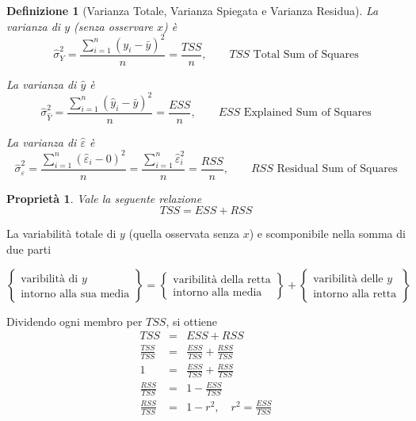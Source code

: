 \documentclass[
  11pt,
]{book}
\theoremstyle{mytheoremstyle}
\newtheorem{proposition}{Proprietà}[section]
\theoremstyle{mydefstyle}
\newtheorem{definition}{Definizione}[section]
\begin{document}
\begin{definition}[Varianza Totale, Varianza Spiegata e Varianza Residua]
La varianza di \(y\) (senza osservare \(x\)) è
\[\hat\sigma_Y^2=\frac{\sum_{i=1}^n(y_i-\bar y)^2}n=\frac{TSS}{n},\qquad\text{$TSS$ Total Sum of Squares}\]

La varianza di \(\hat y\) è
\[\hat\sigma_{\hat Y}^2=\frac{\sum_{i=1}^n(\hat y_i-\bar y)^2}n=\frac{ESS}{n},\qquad\text{$ESS$ Explained Sum of Squares}\]

La varianza di \(\hat \varepsilon\) è
\[\hat\sigma_{\varepsilon}^2=\frac{\sum_{i=1}^n(\hat \varepsilon_i-0)^2}n=\frac{\sum_{i=1}^n\hat \varepsilon_i^2}n=\frac{RSS}{n},\qquad\text{$RSS$ Residual Sum of Squares}\]
\end{definition}

\begin{info}

\begin{proposition}
Vale la seguente relazione
\[TSS = ESS + RSS\]
\end{proposition}

\end{info}

La variabilità totale di \(y\) (quella osservata senza \(x\)) e scomponibile nella somma di due parti

\begin{info}
\[
\left\{\begin{array}{cc}
\text{varibilità di $y$}\\
\text{intorno alla sua media}
\end{array}\right\} =
\left\{\begin{array}{cc}
\text{varibilità della retta}\\
\text{intorno alla media}
\end{array}\right\} +
\left\{\begin{array}{cc}
\text{varibilità delle $y$}\\
\text{intorno alla retta}
\end{array} \right\}
\]

\end{info}

Dividendo ogni membro per \(TSS\), si ottiene
\begin{eqnarray*}
 TSS &=& ESS + RSS \\
 \frac{TSS}{TSS} &=& \frac{ESS}{TSS} + \frac{RSS}{TSS}\\
  1 &=& \frac{ESS}{TSS} + \frac{RSS}{TSS}\\
 \frac{RSS}{TSS} &=& 1 - \frac{ESS}{TSS}\\
 \frac{RSS}{TSS} &=& 1- r^2,\quad r^2=\frac{ESS}{TSS}
\end{eqnarray*}
\end{document}
